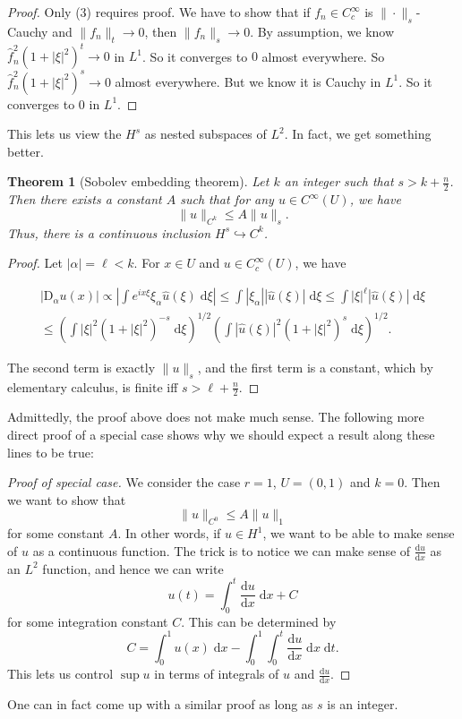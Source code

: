 \documentclass{shortart}
\newtheorem*{thm}{Theorem}
\theoremstyle{definition}
\renewcommand\d{\mathrm{d}}
\newcommand\D{\mathrm{D}}
\begin{document}
\begin{proof}
  Only (3) requires proof. We have to show that if $f_n \in C_c^\infty$ is $\|\cdot\|_s$-Cauchy and $\|f_n\|_t \to 0$, then $\|f_n\|_s \to 0$. By assumption, we know $\hat{f}_n^2(1 + |\xi|^2)^t \to 0$ in $L^1$. So it converges to $0$ almost everywhere. So $\hat{f}_n^2 (1 + |\xi|^2)^s \to 0$ almost everywhere. But we know it is Cauchy in $L^1$. So it converges to $0$ in $L^1$.
\end{proof}

This lets us view the $H^s$ as nested subspaces of $L^2$. In fact, we get something better.
\begin{thm}[Sobolev embedding theorem]
  Let $k$ an integer such that $s > k + \frac{n}{2}$. Then there exists a constant $A$ such that for any $u \in C^{\infty}(U)$, we have
  \[
    \|u\|_{C^k} \leq A \|u\|_s.
  \]
  Thus, there is a continuous inclusion $H^s \hookrightarrow C^k$.
\end{thm}
\begin{proof}
  Let $|\alpha| = \ell < k$. For $x \in U$ and $u \in C^\infty_c(U)$, we have
  \begin{useimager}
    \begin{multline*}
      |\D_\alpha u(x)| \propto \left| \int e^{ix\xi} \xi_\alpha \hat{u}(\xi) \;\d \xi\right| \leq \int |\xi_\alpha| |\hat{u}(\xi)| \;\d \xi \leq \int |\xi|^\ell |\hat{u}(\xi)|\;\d \xi \\
      \leq \left(\int |\xi|^2 (1 + |\xi|^2)^{-s}\;\d \xi\right)^{1/2}\left(\int |\hat{u}(\xi)|^2 (1 + |\xi|^2)^s\;\d \xi\right)^{1/2}.
    \end{multline*}
  \end{useimager}
  The second term is exactly $\|u\|_s$, and the first term is a constant, which by elementary calculus, is finite iff $s > \ell + \frac{n}{2}$.
\end{proof}

Admittedly, the proof above does not make much sense. The following more direct proof of a special case shows why we should expect a result along these lines to be true:
\begin{proof}[Proof of special case]
  We consider the case $r = 1$, $U = (0, 1)$ and $k = 0$. Then we want to show that
  \[
    \|u\|_{C^0} \leq A \|u\|_1
  \]
  for some constant $A$. In other words, if $u \in H^1$, we want to be able to make sense of $u$ as a continuous function. The trick is to notice we can make sense of $\frac{\d u}{\d x}$ as an $L^2$ function, and hence we can write
  \[
    u(t) = \int_0^t \frac{\d u}{\d x}\;\d x + C
  \]
  for some integration constant $C$. This can be determined by
  \[
    C = \int_0^1 u(x)\;\d x - \int_0^1 \int_0^t \frac{\d u}{\d x}\;\d x\;\d t.
  \]
  This lets us control $\sup u$ in terms of integrals of $u$ and $\frac{\d u}{\d x}$.
\end{proof}
One can in fact come up with a similar proof as long as $s$ is an integer.
\end{document}
